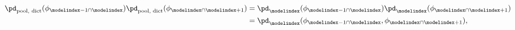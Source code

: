 \begin{equation}
  \begin{aligned}
    \pd_{\text{pool, dict}}(\phi_{\modelindex - 1 \cap \modelindex})
    \pd_{\text{pool, dict}}(\phi_{\modelindex \cap \modelindex + 1})
      &= \pd_{\modelindex}(\phi_{\modelindex - 1 \cap \modelindex}) \pd_{\modelindex}(\phi_{\modelindex \cap \modelindex + 1}) \\
      &= \pd_{\modelindex}(\phi_{\modelindex - 1 \cap \modelindex}, \phi_{\modelindex \cap \modelindex + 1}),
  \end{aligned}
  \label{eqn:dictatorial-def-three-part-three}
\end{equation}